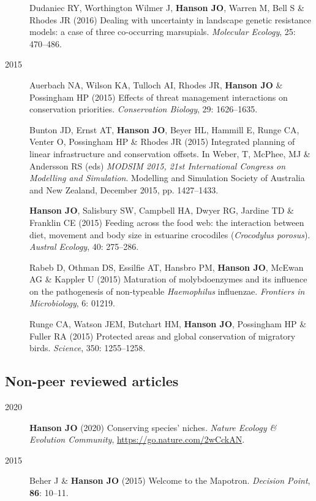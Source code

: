 \documentclass[12pt,a4paper]{article}
\begin{document}
\begin{description}
\item[] Dudaniec RY, Worthington Wilmer J, \textbf{Hanson JO}, Warren M, Bell S \& Rhodes JR (2016) Dealing with uncertainty in landscape genetic resistance models: a case of three co-occurring marsupials. \textit{Molecular Ecology}, 25: 470--486.

\item[2015] Auerbach NA, Wilson KA, Tulloch AI, Rhodes JR, \textbf{Hanson JO} \& Possingham HP (2015) Effects of threat management interactions on conservation priorities. \textit{Conservation Biology}, 29: 1626--1635.

\item[] Bunton JD, Ernst AT, \textbf{Hanson JO}, Beyer HL, Hammill E, Runge CA, Venter O, Possingham HP \& Rhodes JR (2015) Integrated planning of linear infrastructure and conservation offsets. In Weber, T, McPhee, MJ \& Andersson RS (eds) \textit{MODSIM 2015, 21st International Congress on Modelling and Simulation}. Modelling and Simulation Society of Australia and New Zealand, December 2015, pp. 1427--1433.

\item[] \textbf{Hanson JO}, Salisbury SW, Campbell HA, Dwyer RG, Jardine TD \& Franklin CE (2015) Feeding across the food web: the interaction between diet, movement and body size in estuarine crocodiles (\textit{Crocodylus porosus}). \textit{Austral Ecology}, 40: 275--286.

\item[] Rabeb D, Othman DS, Essilfie AT, Hansbro PM, \textbf{Hanson JO}, McEwan AG \& Kappler U (2015) Maturation of molybdoenzymes and its influence on the pathogenesis of non-typeable \textit{Haemophilus} influenzae. \textit{Frontiers in Microbiology}, 6: 01219.

\item[] Runge CA, Watson JEM, Butchart HM, \textbf{Hanson JO}, Possingham HP \& Fuller RA (2015) Protected areas and global conservation of migratory birds. \textit{Science}, 350: 1255--1258.

\end{description}

\subsection*{Non-peer reviewed articles}
\begin{description}

\item[2020] \textbf{Hanson JO} (2020) Conserving species' niches. \textit{Nature Ecology \& Evolution Community}, \url{https://go.nature.com/2wCckAN}.

\item[2015] Beher J \& \textbf{Hanson JO} (2015) Welcome to the Mapotron. \textit{Decision Point}, \textbf{86}: 10--11.

\end{description}
\end{document}
